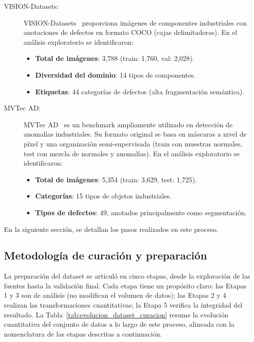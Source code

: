 \begin{description}
    \item[VISION-Datasets:]  VISION-Datasets~\cite{bai2023visiondatasets} proporciona imágenes de componentes industriales con anotaciones de defectos en formato COCO (cajas delimitadoras). En el análisis exploratorio se identificaron:
\begin{itemize}
    \item \textbf{Total de imágenes}: 3{,}788 (train: 1{,}760, val: 2{,}028).
    \item \textbf{Diversidad del dominio}: 14 tipos de componentes.
    \item \textbf{Etiquetas}: 44 categorías de defectos (alta fragmentación semántica).
\end{itemize}
    \item[MVTec AD:] MVTec AD~\cite{bergmann2019mvtec} es un benchmark ampliamente utilizado en detección de anomalías industriales. Su formato original se basa en máscaras a nivel de píxel y una organización semi-supervisada (train con muestras normales, test con mezcla de normales y anomalías). En el análisis exploratorio se identificaron:
\begin{itemize}
    \item \textbf{Total de imágenes}: 5{,}354 (train: 3{,}629, test: 1{,}725).
    \item \textbf{Categorías}: 15 tipos de objetos industriales.
    \item \textbf{Tipos de defectos}: 49, anotados principalmente como segmentación.
\end{itemize}
\end{description}

En la siguiente sección, se detallan los pasos realizados en este proceso.

\subsection{Metodología de curación y preparación}

La preparación del dataset se articuló en cinco etapas, desde la exploración de las fuentes hasta la validación final. Cada etapa tiene un propósito claro: las Etapas 1 y 3 son de análisis (no modifican el volumen de datos); las Etapas 2 y 4 realizan las transformaciones cuantitativas; la Etapa 5 verifica la integridad del resultado. La Tabla~\ref{tab:evolucion_dataset_curacion} resume la evolución cuantitativa del conjunto de datos a lo largo de este proceso, alineada con la nomenclatura de las etapas descritas a continuación.

